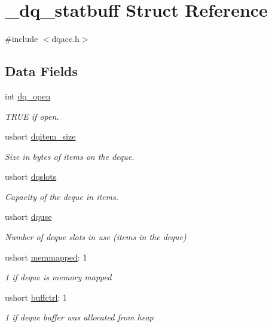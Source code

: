 \hypertarget{struct__dq__statbuff}{\section{\-\_\-dq\-\_\-statbuff Struct Reference}
\label{struct__dq__statbuff}
}


{\ttfamily \#include $<$dqacc.\-h$>$}

\subsection*{Data Fields}
\begin{DoxyCompactItemize}
\item 
int \hyperlink{struct__dq__statbuff_a2cfb815275868f448170339b01fb68a6}{dq\-\_\-open}
\begin{DoxyCompactList}\small\item\em T\-R\-U\-E if open. \end{DoxyCompactList}\item 
ushort \hyperlink{struct__dq__statbuff_a40241a744320a331e0a0c37ecc1a7b8b}{dqitem\-\_\-size}
\begin{DoxyCompactList}\small\item\em Size in bytes of items on the deque. \end{DoxyCompactList}\item 
ushort \hyperlink{struct__dq__statbuff_a569a481b9cdc53a7e96804a51643e504}{dqslots}
\begin{DoxyCompactList}\small\item\em Capacity of the deque in items. \end{DoxyCompactList}\item 
ushort \hyperlink{struct__dq__statbuff_a2fdb1d169ae74820026e2897a3dec9a3}{dquse}
\begin{DoxyCompactList}\small\item\em Number of deque slots in use (items in the deque) \end{DoxyCompactList}\item 
ushort \hyperlink{struct__dq__statbuff_a738331e6f1d54405b568a4c032f8c8eb}{memmapped}\-: 1
\begin{DoxyCompactList}\small\item\em 1 if deque is memory mapped \end{DoxyCompactList}\item 
ushort \hyperlink{struct__dq__statbuff_a9f1a8e591d86f4e9e40c723dbb9f1d34}{buffctrl}\-: 1
\begin{DoxyCompactList}\small\item\em 1 if deque buffer was allocated from heap \end{DoxyCompactList}\end{DoxyCompactItemize}


